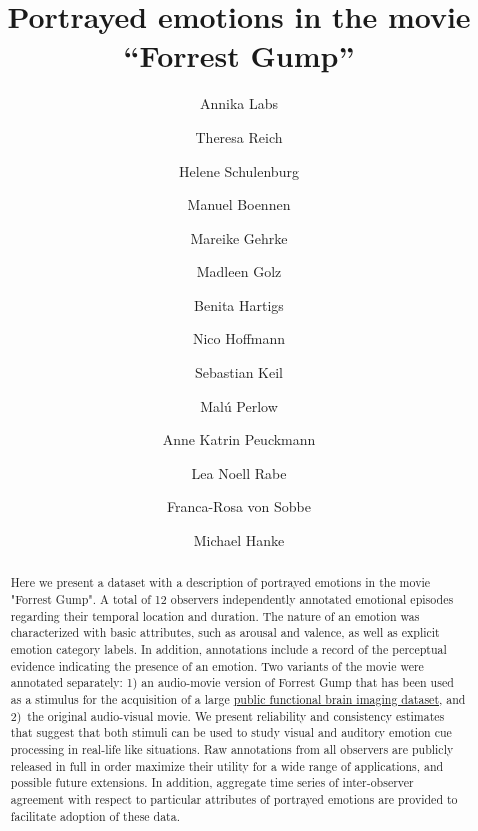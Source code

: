 \documentclass[10pt,a4paper,twocolumn]{article}
\begin{document}


\title{Portrayed emotions in the movie ``Forrest Gump''}

\author[1,*]{Annika Labs }%
\author[1,*]{Theresa Reich }%
\author[1,*]{Helene Schulenburg }%
\author[1]{Manuel Boennen }%
\author[1]{Mareike Gehrke }%
\author[1]{Madleen Golz }%
\author[1]{Benita Hartigs }%
\author[1]{Nico Hoffmann }%
\author[1]{Sebastian Keil }%
\author[1]{Malú Perlow }%
\author[1]{Anne Katrin Peuckmann }%
\author[1]{Lea Noell Rabe }%
\author[1]{Franca-Rosa von Sobbe }%
\author[1,2]{Michael Hanke }%

\maketitle
\thispagestyle{fancy}

\begin{abstract}
Here we present a dataset with a description of portrayed emotions in the movie
"Forrest Gump". A total of 12 observers independently annotated emotional
episodes regarding their temporal location and duration. The nature of an
emotion was characterized with basic attributes, such as arousal and valence,
as well as explicit emotion category labels. In addition, annotations include a
record of the perceptual evidence indicating the presence of an emotion. Two
variants of the movie were annotated separately: 1) an audio-movie version of
Forrest Gump that has been used as a stimulus for the acquisition of a large
\href{http://studyforrest.org}{public functional brain imaging dataset}, and
2)~the original audio-visual movie. We present reliability and consistency
estimates that suggest that both stimuli can be used to study visual and
auditory emotion cue processing in real-life like situations. Raw annotations
from all observers are publicly released in full in order maximize their
utility for a wide range of applications, and possible future extensions. In
addition, aggregate time series of inter-observer agreement with respect to
particular attributes of portrayed emotions are provided to facilitate adoption
of these data.
\end{abstract}
\clearpage
\end{document}
